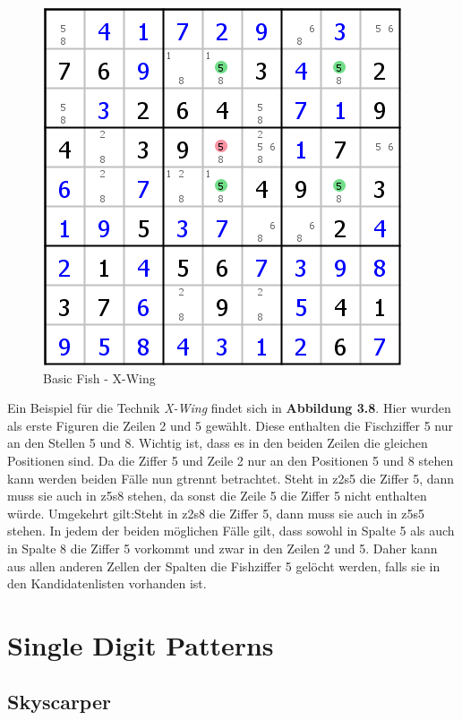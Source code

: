 \documentclass[accentcolor=tud6b,11pt,paper=a4]{tudreport}
\begin{document}
\begin{figure}[h]
\begin{center}
\includegraphics{./img/x_wing.png}
\caption{Basic Fish - X-Wing}
\end{center}
\end{figure}

Ein Beispiel für die Technik \textit{X-Wing} findet sich in \textbf{Abbildung 3.8}. Hier wurden als erste Figuren die Zeilen 2 und 5 gewählt. Diese enthalten die Fischziffer 5 nur an den Stellen 5 und 8. Wichtig ist, dass es in den beiden Zeilen die gleichen Positionen sind. Da die Ziffer 5 und Zeile 2 nur an den Positionen 5 und 8 stehen kann werden beiden Fälle nun gtrennt betrachtet. Steht in z2s5 die Ziffer 5, dann muss sie auch in z5s8 stehen, da sonst die Zeile 5 die Ziffer 5 nicht enthalten würde. Umgekehrt gilt:Steht in z2s8 die Ziffer 5, dann muss sie auch in z5s5 stehen. In jedem der beiden möglichen Fälle gilt, dass sowohl in Spalte 5 als auch in Spalte 8 die Ziffer 5 vorkommt und zwar in den Zeilen 2 und 5. Daher kann aus allen anderen Zellen der Spalten die Fishziffer 5 gelöcht werden, falls sie in den Kandidatenlisten vorhanden ist.

\newpage
\section{Single Digit Patterns}

\newpage
\subsection{Skyscarper}
\end{document}
